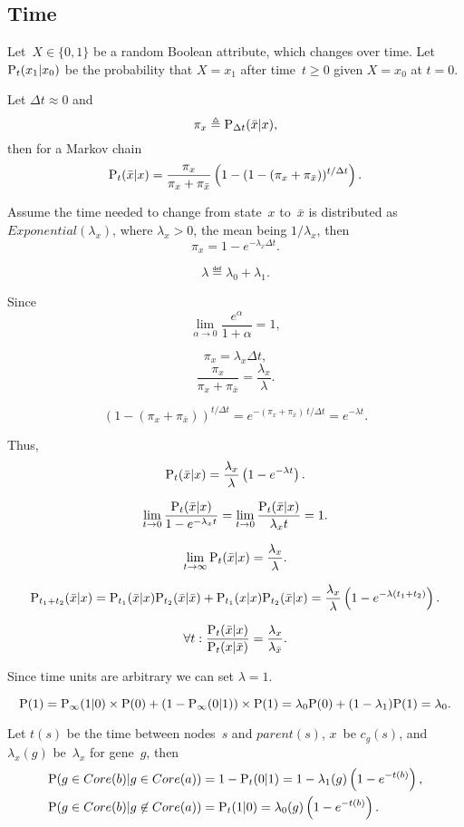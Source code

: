 \documentclass[10pt,a4paper]{article}
\theoremstyle{plain} \newtheorem{Lem}{Lemma}
\begin{document}
\subsection {Time}

Let~$X \in \{0,1\}$ be a random Boolean attribute, which changes over time.
Let $\P_t(x_1|x_0)$ be the probability that $X = x_1$ after time~$t \ge 0$ given $X = x_0$ at $t=0$.

Let $\Delta t \approx 0$ and
$$ \pi_x \eqdef \P_{\Delta t}(\bar x|x), $$
then for a Markov chain
$$ \P_t(\bar x|x) = \frac {\pi_x} {\pi_x + \pi_{\bar x}} \left(1 - (1 - (\pi_x + \pi_{\bar x}))^{t / \Delta t} \right). $$

Assume the time needed to change from state~$x$ to~$\bar x$ is distributed as $Exponential(\lambda_x)$, where $\lambda_x > 0$,
the mean being $1 / \lambda_x$,
then
$$ \pi_x = 1 - e^{- \lambda_x \Delta t}. $$

$$ \lambda \eqdef \lambda_0 + \lambda_1. $$

Since
$$ \lim_{\alpha \to 0} \frac {e^\alpha} {1 + \alpha} = 1, $$

$$ \pi_x = \lambda_x \Delta t, $$
$$ \frac {\pi_x} {\pi_x + \pi_{\bar x}} = \frac {\lambda_x} \lambda. $$

$$ (1 - (\pi_x + \pi_{\bar x}))^{t / \Delta t} = e^{-(\pi_x + \pi_{\bar x}) \ t / \Delta t}= e^{-\lambda t}.$$

Thus,
$$ \P_t(\bar x|x) = \frac {\lambda_x} \lambda \left(1 -  e^{-\lambda t} \right). $$

$$ \lim_{t \to 0} \frac {\P_t(\bar x|x)} {1 - e^{- \lambda_x t}} = \lim_{t \to 0} \frac {\P_t(\bar x|x)} {\lambda_x t} = 1. $$

$$ \lim_{t \to \infty} \P_t(\bar x|x) = \frac {\lambda_x} \lambda. $$

$$ \P_{t_1 + t_2}(\bar x|x) = \P_{t_1}(\bar x|x) \P_{t_2}(\bar x|\bar x) + \P_{t_1}(x|x) \P_{t_2}(\bar x|x) 
  = \frac {\lambda_x} \lambda \left(1 -  e^{-\lambda (t_1 + t_2)} \right). 
$$

$$ \forall t: \frac {\P_t(\bar x|x)} {\P_t(x|\bar x)} = \frac {\lambda_x} {\lambda_{\bar x}}. $$

Since time units are arbitrary we can set $\lambda = 1$.

$$ \P(1) = \P_\infty(1|0) \times \P(0) + (1 - \P_\infty(0|1)) \times \P(1) = \lambda_0 \P(0) + (1 - \lambda_1) \P(1) = \lambda_0. $$

Let $t(s)$ be the time between nodes~$s$ and $parent(s)$,
$x$~be $c_g(s)$, 
and $\lambda_x(g)$ be~$\lambda_x$ for gene~$g$,
then
\begin{equation*} 
\begin{split}
\P (g \in Core(b) | g \in Core(a)) &= 1 - \P_t(0|1) = 1 - \lambda_1(g) \left(1-e^{-t(b)} \right), \\
\P (g \in Core(b) | g \not \in Core(a)) &= \P_t(1|0)     = \lambda_0(g) \left(1-e^{-t(b)} \right). 
\end{split}
\end{equation*}
\end{document}
